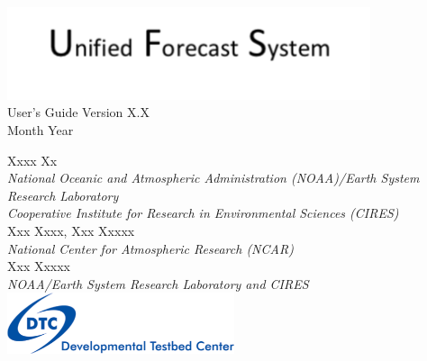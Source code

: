 \begin{titlepage}
{}
\noindent
   \begin{center}     

      \includegraphics[width=0.8\textwidth]{images/UFSbanner.png}\\[2em]
     {\color{darkcerulean}
        \Huge{User's Guide Version X.X }\\[1em]       
        \normalsize{Month Year}\\[5em] 
       }
 
      \normalsize{Xxxx Xx}\\ 
      \textit{\small{National Oceanic and Atmospheric Administration (NOAA)/Earth System Research Laboratory}}\\
      \textit{\small{Cooperative Institute for Research in Environmental Sciences (CIRES)}}\\[2em]
      \normalsize{Xxx Xxxx, Xxx Xxxxx}\\
      \textit{\small{National Center for Atmospheric Research (NCAR)}}\\[2em]
      \normalsize{Xxx Xxxxx}\\
      \textit{\small{NOAA/Earth System Research Laboratory and CIRES}}\\[4em]
    
       \includegraphics[width=0.5\textwidth]{images/DTClogo.png}\\
         
      \vspace{1em}

   \end{center}
   \restoregeometry
\end{titlepage}
\pagebreak{}




